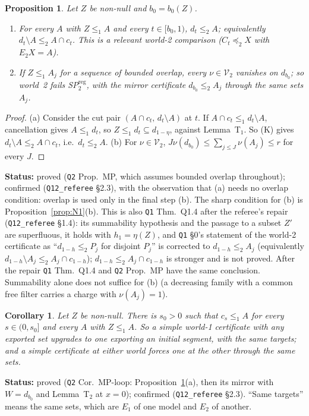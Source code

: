 \documentclass[11pt]{article}
\newtheorem{proposition}[theorem]{Proposition}
\newtheorem{corollary}[theorem]{Corollary}
\theoremstyle{definition}
\theoremstyle{remark}
\newcommand{\src}[1]{\texttt{#1}}
\newcommand{\status}[1]{\par\smallskip\noindent\textbf{Status:} #1\par\smallskip}
\begin{document}
\begin{proposition}\label{prop:MP}
Let $Z$ be non-null and $b_0=b_0(Z)$.
\begin{enumerate}[leftmargin=*,label=(\alph*)]
\item For every $A$ with $Z\le_1A$ and every $t\in[b_0,1)$, $d_t\le_2A$; equivalently $d_t\setminus A\le_2A\cap c_t$. This is a relevant world-2 comparison ($C_t\preceq_2X$ with $E_2X=A$).
\item If $Z\le_1A_j$ for a sequence of bounded overlap, every $\nu\in\mathcal V_2$ vanishes on $d_{b_0}$; so world~2 fails SP$^{\mathrm{reg}}_2$, with the mirror certificate $d_{b_0}\le_2A_j$ through the same sets $A_j$.
\end{enumerate}
\end{proposition}
\begin{proof}
(a) Consider the cut pair $(A\cap c_t,\,d_t\setminus A)$ at $t$. If $A\cap c_t\le_1d_t\setminus A$, cancellation gives $A\le_1d_t$, so $Z\le_1d_t\subseteq d_{1-\eta}$, against Lemma~T$_1$. So (K) gives $d_t\setminus A\le_2A\cap c_t$, i.e.\ $d_t\le_2A$. (b) For $\nu\in\mathcal V_2$, $J\nu(d_{b_0})\le\sum_{j\le J}\nu(A_j)\le r$ for every $J$.
\end{proof}
\status{proved (\src{Q2} Prop.~MP, which assumes bounded overlap throughout); confirmed (\src{Q12\_referee} \S2.3), with the observation that (a) needs no overlap condition: overlap is used only in the final step (b). The sharp condition for (b) is Proposition~\ref{prop:N1}(b). This is also \src{Q1} Thm.~Q1.4 after the referee's repair (\src{Q12\_referee} \S1.4): its summability hypothesis and the passage to a subset $Z'$ are superfluous, it holds with $h_1=\eta(Z)$, and \src{Q1} \S0's statement of the world-2 certificate as ``$d_{1-h}\le_2P_j$ for disjoint $P_j$'' is corrected to $d_{1-h}\le_2A_j$ (equivalently $d_{1-h}\setminus A_j\le_2A_j\cap c_{1-h}$); $d_{1-h}\le_2A_j\cap c_{1-h}$ is stronger and is not proved. After the repair \src{Q1} Thm.~Q1.4 and \src{Q2} Prop.~MP have the same conclusion. Summability alone does not suffice for (b) (a decreasing family with a common free filter carries a charge with $\nu(A_j)=1$).}

\begin{corollary}\label{cor:MPloop}
Let $Z$ be non-null. There is $s_0>0$ such that $c_s\le_1A$ for every $s\in(0,s_0]$ and every $A$ with $Z\le_1A$. So a simple world-1 certificate with any exported set upgrades to one exporting an initial segment, with the same targets; and a simple certificate at either world forces one at the other through the same sets.
\end{corollary}
\status{proved (\src{Q2} Cor.~MP-loop: Proposition~\ref{prop:MP}(a), then its mirror with $W=d_{b_0}$ and Lemma~T$_2$ at $x=0$); confirmed (\src{Q12\_referee} \S2.3). ``Same targets'' means the same sets, which are $E_1$ of one model and $E_2$ of another.}
\end{document}
